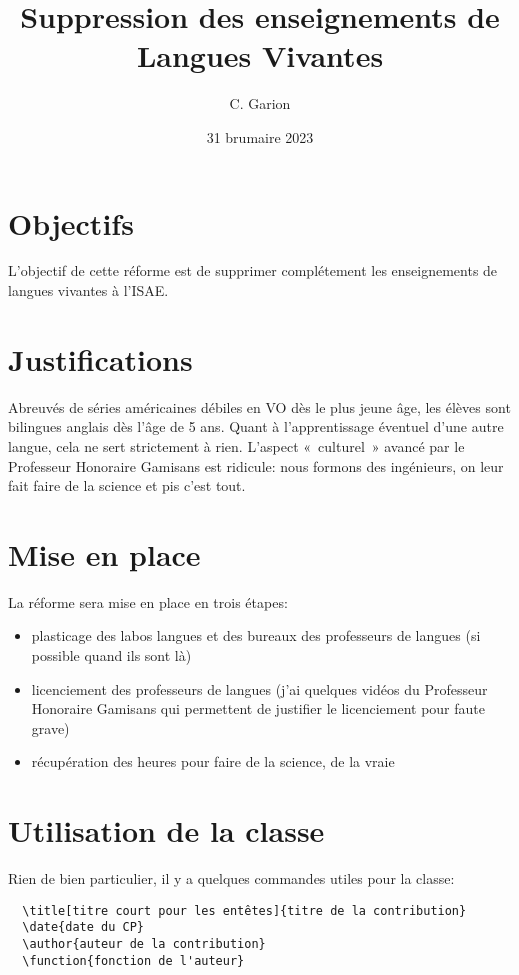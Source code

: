 \documentclass[french]{supaero-note-cf}
\begin{document}
\title{Suppression des enseignements de Langues Vivantes}
\author{C. Garion}
\date{31 brumaire 2023}

\section{Objectifs}
\label{sec:objectifs}

L'objectif de cette réforme est de supprimer complétement les
enseignements de langues vivantes à l'ISAE.

\section{Justifications}
\label{sec:justifications}

Abreuvés de séries américaines débiles en VO dès le plus jeune âge,
les élèves sont bilingues anglais dès l'âge de 5 ans. Quant à
l'apprentissage éventuel d'une autre langue, cela ne sert strictement
à rien. L'aspect «~culturel~» avancé par le Professeur Honoraire
Gamisans est ridicule: nous formons des ingénieurs, on leur fait faire
de la science et pis c'est tout.

\section{Mise en place}
\label{sec:mise-en-place}

La réforme sera mise en place en trois étapes:

\begin{itemize}
\item plasticage des labos langues et des bureaux des professeurs de
  langues (si possible quand ils sont là)
\item licenciement des professeurs de langues (j'ai quelques vidéos du
  Professeur Honoraire Gamisans qui permettent de justifier le
  licenciement pour faute grave)
\item récupération des heures pour faire de la science, de la vraie
\end{itemize}

\section{Utilisation de la classe}
\label{sec:utilisation-de-la}

Rien de bien particulier, il y a quelques commandes utiles pour la
classe:

\begin{verbatim}
  \title[titre court pour les entêtes]{titre de la contribution}
  \date{date du CP}
  \author{auteur de la contribution}
  \function{fonction de l'auteur}
\end{verbatim}
\end{document}
